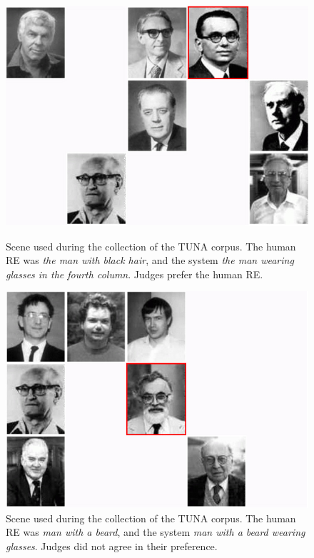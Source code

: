 \begin{figure}[h]
\begin{minipage}{0.50\linewidth}
\centering
\includegraphics[width=\textwidth]{images/s59t26.jpg}
\caption{Scene used during the collection of the TUNA corpus. The human  RE was \emph{the man with black hair}, and the system \emph{the man wearing glasses in the fourth column}. Judges prefer the human RE.}
\label{s28t25}
\end{minipage}
\begin{minipage}{0.50\linewidth}
\centering
\includegraphics[width=\textwidth]{images/s315t21.jpg}
\caption{Scene used during the collection of the TUNA corpus. The human RE was \emph{man with a beard}, and the system \emph{man with a beard wearing glasses}. Judges did not agree in their preference.}
\label{s307t21}
\end{minipage}
\end{figure}

